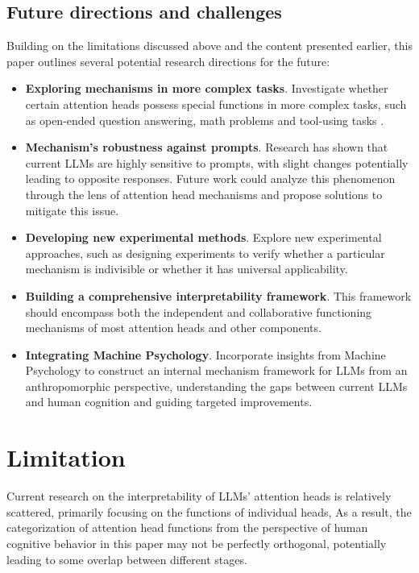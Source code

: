 \documentclass[12pt,letterpaper]{article}
\begin{document}
\subsection*{Future directions and challenges}
Building on the limitations discussed above and the content presented earlier, this paper outlines several potential research directions for the future:
\begin{itemize}
    \item \textbf{Exploring mechanisms in more complex tasks}. Investigate whether certain attention heads possess special functions in more complex tasks, such as open-ended question answering,\citep{XSUM_18_arXiv,NewsBench_24_ACL_Melbourne} math problems \citep{MATH_21_arXiv,GSM8K_21_arXiv} and tool-using tasks \citep{TEval_24_ACL_USTC}.
    
    \item \textbf{Mechanism's robustness against prompts}. Research has shown that current LLMs are highly sensitive to prompts, with slight changes potentially leading to opposite responses.\citep{xFinder_24_arXiv_IAAR} Future work could analyze this phenomenon through the lens of attention head mechanisms and propose solutions to mitigate this issue.
    
    \item \textbf{Developing new experimental methods}. Explore new experimental approaches, such as designing experiments to verify whether a particular mechanism is indivisible or whether it has universal applicability.
    
    \item \textbf{Building a comprehensive interpretability framework}. This framework should encompass both the independent and collaborative functioning mechanisms of most attention heads and other components.
    
    \item \textbf{Integrating Machine Psychology}. Incorporate insights from Machine Psychology to construct an internal mechanism framework for LLMs from an anthropomorphic perspective, understanding the gaps between current LLMs and human cognition and guiding targeted improvements.
\end{itemize}


\section*{Limitation} \label{sec:Limitation}
Current research on the interpretability of LLMs’ attention heads is relatively scattered, primarily focusing on the functions of individual heads,  As a result, the categorization of attention head functions from the perspective of human cognitive behavior in this paper may not be perfectly orthogonal, potentially leading to some overlap between different stages.
\end{document}
